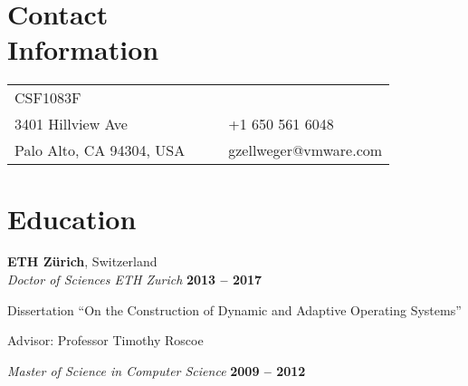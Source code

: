 \documentclass[margin,line]{cv/cv}
\begin{document}
\begin{resume}

    \section{\mysidestyle Contact\\Information}

    \begin{tabularx}{\textwidth}{lXcl}
        CSF1083F                                                                         \\
        3401 Hillview Ave        &  & \raisebox{-3pt}{\Phone}    & +1  650 561 6048      \\
        Palo Alto, CA 94304, USA &  & \raisebox{-3pt}{\Envelope} & gzellweger@vmware.com \\
    \end{tabularx}

    \section{\mysidestyle  Education}

    \textbf{ETH Zürich}, Switzerland \vspace{2mm}\\\vspace{1mm}%
    \textsl{Doctor of Sciences ETH Zurich} \hfill \textbf{2013 -- 2017}\vspace{-3mm}\\\vspace{-1mm}%
    \begin{list2}
        \item Dissertation ``On the Construction of Dynamic and Adaptive Operating Systems''
        \item Advisor: Professor Timothy Roscoe
    \end{list2}\vspace{-1.5mm}

    \textsl{Master of Science in Computer Science} \hfill \textbf{2009 -- 2012}\vspace{-3mm}\\\vspace{-1mm}%


\end{resume}
\end{document}
